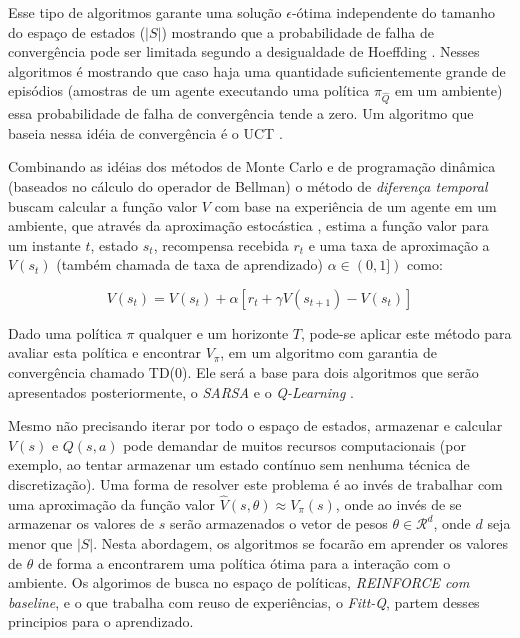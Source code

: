 \documentclass[letterpaper]{article}
\begin{document}

Esse tipo de algoritmos garante uma solução $\epsilon$-ótima independente do tamanho do espaço de estados ($|S|$) mostrando que a probabilidade de falha de convergência pode ser limitada segundo a desigualdade de Hoeffding \cite{Hoeffding-1994}. Nesses algoritmos é mostrando que caso haja uma quantidade suficientemente grande de episódios (amostras de um agente executando uma política $\pi_{\hat{Q}}$ em um ambiente) essa probabilidade de falha de convergência tende a zero. Um algoritmo que baseia nessa idéia de convergência é o UCT \cite{KocsisSzepesv-2006}.

Combinando as idéias dos métodos de Monte Carlo e de programação dinâmica (baseados no cálculo do operador de Bellman) o método de \textit{diferença temporal} buscam calcular a função valor $V$ com base na experiência de um agente em um ambiente, que através da aproximação estocástica \cite{RobbinsMonro-1951}, estima a função valor para um instante $t$, estado $s_t$, recompensa recebida $r_t$ e  uma taxa de aproximação a $V(s_t)$ (também chamada de taxa de aprendizado) $\alpha \in (0, 1])$ como:

\begin{equation} \label{eq:temporal_difference}
  V(s_t) = V(s_t) + \alpha [ r_t + \gamma V(s_{t+1}) - V(s_t) ]
\end{equation}

Dado uma política $\pi$ qualquer e um horizonte $T$, pode-se aplicar este método para avaliar esta política e encontrar $V_{\pi}$, em um algoritmo com garantia de convergência chamado \textsc{TD(0)}. Ele será a base para dois algoritmos que serão apresentados posteriormente, o \textit{SARSA} e o \textit{Q-Learning} \cite{Watkins-Dayan-1992}.

Mesmo não precisando iterar por todo o espaço de estados, armazenar e calcular $V(s)$ e $Q(s,a)$ pode demandar de muitos recursos computacionais (por exemplo, ao tentar armazenar um estado contínuo sem nenhuma técnica de discretização). Uma forma de resolver este problema é ao invés de trabalhar com uma aproximação da função valor $ \hat{V}(s, \theta) \approx V_{\pi}(s)$, onde ao invés de se armazenar os valores de $s$ serão armazenados o vetor de pesos $\theta \in \mathcal{R}^d$, onde $d$ seja menor que $|S|$. Nesta abordagem, os algoritmos se focarão em aprender os valores de $\theta$ de forma a encontrarem uma política ótima para a interação com o ambiente. Os algorimos de busca no espaço de políticas, \textit{REINFORCE com baseline}, e o que trabalha com reuso de experiências, o \textit{Fitt-Q}, partem desses principios para o aprendizado.
\end{document}
